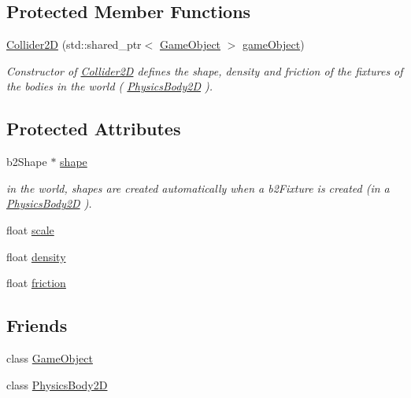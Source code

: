 \subsection*{Protected Member Functions}
\begin{DoxyCompactItemize}
\item 
\hyperlink{class_mason_1_1_collider2_d_a6873ad74052b0edb69dc61fcadace96b}{Collider2D} (std\+::shared\+\_\+ptr$<$ \hyperlink{class_mason_1_1_game_object}{Game\+Object} $>$ \hyperlink{class_mason_1_1_component_abaa67b569d0a70e26a4606f4a099a925}{game\+Object})
\begin{DoxyCompactList}\small\item\em Constructor of \hyperlink{class_mason_1_1_collider2_d}{Collider2D} defines the shape, density and friction of the fixtures of the bodies in the world ( \hyperlink{class_mason_1_1_physics_body2_d}{Physics\+Body2D} ). \end{DoxyCompactList}\end{DoxyCompactItemize}
\subsection*{Protected Attributes}
\begin{DoxyCompactItemize}
\item 
b2\+Shape $\ast$ \hyperlink{class_mason_1_1_collider2_d_a82de033fe10f7da3fd079c7ff54eaf94}{shape}
\begin{DoxyCompactList}\small\item\em in the world, shapes are created automatically when a b2\+Fixture is created (in a \hyperlink{class_mason_1_1_physics_body2_d}{Physics\+Body2D} ). \end{DoxyCompactList}\item 
float \hyperlink{class_mason_1_1_collider2_d_ac0b6fb4b2bb5add1c96b4e1a8c6c0567}{scale}
\item 
float \hyperlink{class_mason_1_1_collider2_d_ad3b9178c829dbe0a8a25a75d643f8744}{density}
\item 
float \hyperlink{class_mason_1_1_collider2_d_ab08954cffa1ac7539e26c4e2da535481}{friction}
\end{DoxyCompactItemize}
\subsection*{Friends}
\begin{DoxyCompactItemize}
\item 
class \hyperlink{class_mason_1_1_collider2_d_a00df87c957d8f7ee0fc51f07a0542f4a}{Game\+Object}
\item 
class \hyperlink{class_mason_1_1_collider2_d_a60dcb177f208afef9864b04ec483a960}{Physics\+Body2D}
\end{DoxyCompactItemize}



